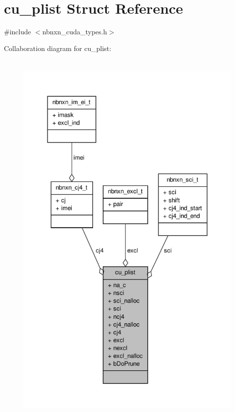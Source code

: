 \hypertarget{structcu__plist}{\section{cu\-\_\-plist \-Struct \-Reference}
\label{structcu__plist}
}


{\ttfamily \#include $<$nbnxn\-\_\-cuda\-\_\-types.\-h$>$}



\-Collaboration diagram for cu\-\_\-plist\-:
\nopagebreak
\begin{figure}[H]
\begin{center}
\leavevmode
\includegraphics[height=550pt]{structcu__plist__coll__graph}
\end{center}
\end{figure}
